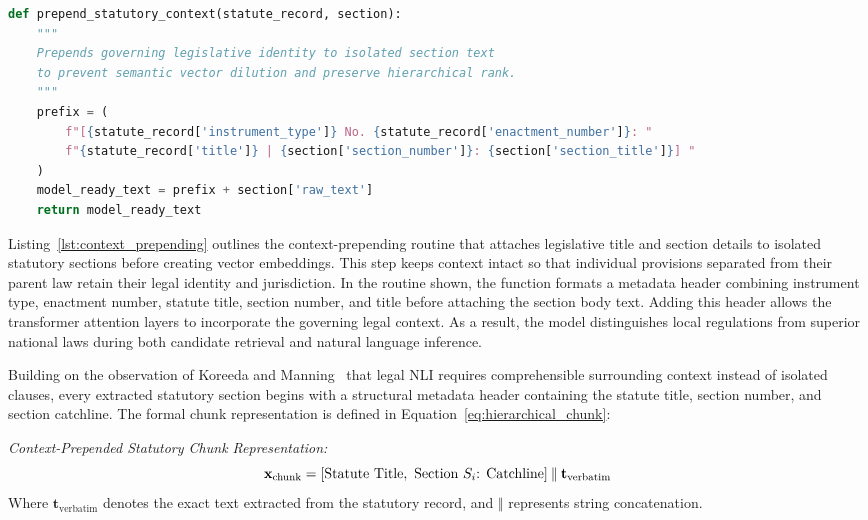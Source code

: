         \begin{lstlisting}[language=Python, caption={Pseudocode of Section Context Prepending for Granular Provision Chunking}, label={lst:context_prepending}]
def prepend_statutory_context(statute_record, section):
    """
    Prepends governing legislative identity to isolated section text
    to prevent semantic vector dilution and preserve hierarchical rank.
    """
    prefix = (
        f"[{statute_record['instrument_type']} No. {statute_record['enactment_number']}: "
        f"{statute_record['title']} | {section['section_number']}: {section['section_title']}] "
    )
    model_ready_text = prefix + section['raw_text']
    return model_ready_text
        \end{lstlisting}

        Listing~\ref{lst:context_prepending} outlines the context-prepending routine that attaches legislative title and section details to isolated statutory sections before creating vector embeddings. This step keeps context intact so that individual provisions separated from their parent law retain their legal identity and jurisdiction. In the routine shown, the function formats a metadata header combining instrument type, enactment number, statute title, section number, and title before attaching the section body text. Adding this header allows the transformer attention layers to incorporate the governing legal context. As a result, the model distinguishes local regulations from superior national laws during both candidate retrieval and natural language inference.

        Building on the observation of Koreeda and Manning~\cite{koreeda2021contract} that legal NLI requires comprehensible surrounding context instead of isolated clauses, every extracted statutory section begins with a structural metadata header containing the statute title, section number, and section catchline. The formal chunk representation is defined in Equation~\ref{eq:hierarchical_chunk}:

        \noindent\textit{Context-Prepended Statutory Chunk Representation:}
        \begin{equation}
            \mathbf{x}_{\text{chunk}} = \left[ \text{Statute Title}, \text{ Section } S_i\text{: Catchline} \right] \mathbin{\Vert} \mathbf{t}_{\text{verbatim}}
            \label{eq:hierarchical_chunk}
            \eqcaption{Context-Prepended Statutory Chunk Representation}
        \end{equation}
        \noindent Where $\mathbf{t}_{\text{verbatim}}$ denotes the exact text extracted from the statutory record, and $\mathbin{\Vert}$ represents string concatenation.

